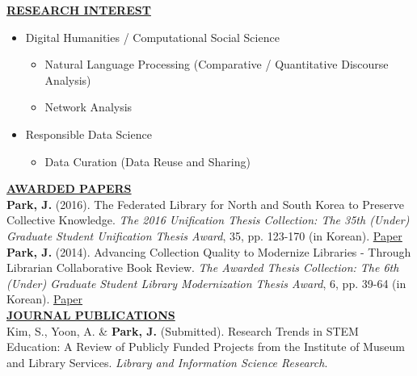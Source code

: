 \documentclass{article}
\begin{document}
\noindent \textbf{\underline{RESEARCH INTEREST}} 
\begin{itemize}[noitemsep,nolistsep,leftmargin=*]
\item {Digital Humanities / Computational Social Science}
\begin{itemize}
    \item {Natural Language Processing (Comparative / Quantitative Discourse Analysis)}
    \item {Network Analysis}
\end{itemize}
\item {Responsible Data Science}
    \begin{itemize}
        \item {Data Curation (Data Reuse and Sharing)\\}
    \end{itemize}
\end{itemize}

%
%
\noindent \textbf{\underline{AWARDED PAPERS}} \\
\noindent \textbf{Park, J.} (2016). The Federated Library for North and South Korea to Preserve Collective Knowledge. \textit{The 2016 Unification Thesis Collection: The 35th (Under) Graduate Student Unification Thesis Award}, 35, pp. 123-170 (in Korean). \hfill \href{https://uniedu.go.kr/uniedu/home/pds/pdsatcl/view.do?id=19773&mid=SM00000532&limit=20&sc=T&eqOdrby=false&eqViewYn=true&odr=news}{Paper}\\ 

\noindent \textbf{Park, J.} (2014). Advancing Collection Quality to Modernize Libraries - Through Librarian Collaborative Book Review. \textit{The Awarded Thesis Collection: The 6th (Under) Graduate Student Library Modernization Thesis Award}, 6, pp. 39-64 (in Korean). \hfill \href{https://oak.go.kr/nl-ir/handle/2020.oak/304}{Paper}\\

\noindent \textbf{\underline{JOURNAL PUBLICATIONS}} \\
\noindent Kim, S., Yoon, A. \& \textbf{Park, J.} (Submitted). Research Trends in STEM Education: A Review of Publicly Funded Projects from the Institute of Museum and Library Services. \textit{Library and Information Science Research}. \\
\end{document}
